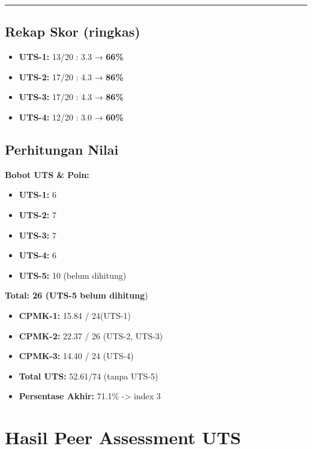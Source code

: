 \documentclass[
  letterpaper,
  DIV=11,
  numbers=noendperiod]{scrreprt}
\providecommand{\tightlist}{%
  \setlength{\itemsep}{0pt}\setlength{\parskip}{0pt}}
\begin{document}
\begin{center}\rule{0.5\linewidth}{0.5pt}\end{center}

\section{Rekap Skor (ringkas)}\label{rekap-skor-ringkas}

\begin{itemize}
\tightlist
\item
  \textbf{UTS-1:} 13/20 : 3.3 → \textbf{66\%}
\item
  \textbf{UTS-2:} 17/20 : 4.3 → \textbf{86\%}
\item
  \textbf{UTS-3:} 17/20 : 4.3 → \textbf{86\%}
\item
  \textbf{UTS-4:} 12/20 : 3.0 → \textbf{60\%}
\end{itemize}

\section{Perhitungan Nilai}\label{perhitungan-nilai}

\textbf{Bobot UTS \& Poin:}

\begin{itemize}
\item
  \textbf{UTS-1:} 6
\item
  \textbf{UTS-2:} 7
\item
  \textbf{UTS-3:} 7
\item
  \textbf{UTS-4:} 6
\item
  \textbf{UTS-5:} 10 (belum dihitung)
\end{itemize}

\textbf{Total: 26 (UTS-5 belum dihitung})

\begin{itemize}
\item
  \textbf{CPMK-1:} 15.84 / 24(UTS-1)
\item
  \textbf{CPMK-2:} 22.37 / 26 (UTS-2, UTS-3)
\item
  \textbf{CPMK-3:} 14.40 / 24 (UTS-4)
\item
  \textbf{Total UTS:} 52.61/74 (tanpa UTS-5)
\item
  \textbf{Persentase Akhir:} 71.1\% -\textgreater{} index 3
\end{itemize}


\chapter{Hasil Peer Assessment UTS}\label{hasil-peer-assessment-uts}
\end{document}
